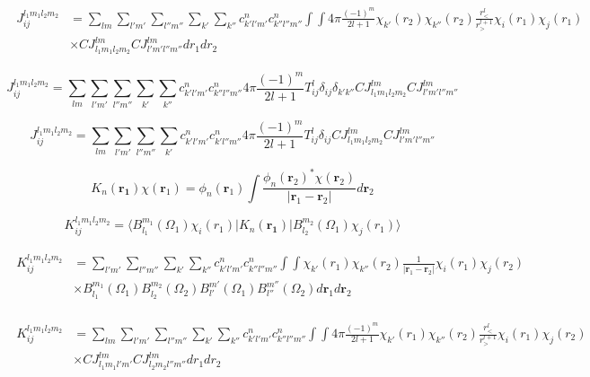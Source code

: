 \documentclass[nobibnotes, amssymb,aps,superscriptaddress]{revtex4-1}
\begin{document}
\begin{eqnarray}
\begin{split}
J_{ij}^{l_1m_1l_2m_2}&=\sum_{lm}\sum_{l'm'}\sum_{l''m''}\sum_{k'}\sum_{k''} c_{k'l'm'}^n c_{k''l''m''}^n \int \int 4\pi \frac{(-1)^m}{2l+1}\chi_{k'}(r_2) \chi_{k''}(r_2)\frac{r^l_{<}}{r^{l+1}_>}\chi_{i}(r_1) \chi_{j}(r_1)\\
& \times CJ_{l_1m_1l_2m_2}^{lm}CJ_{l'm'l''m''}^{lm} dr_1dr_2
\end{split}
\end{eqnarray}

\begin{equation}
J_{ij}^{l_1m_1l_2m_2}=\sum_{lm}\sum_{l'm'}\sum_{l''m''}\sum_{k'}\sum_{k''} c_{k'l'm'}^n c_{k''l''m''}^n 4\pi \frac{(-1)^m}{2l+1} T^l_{ij} \delta_{ij} \delta_{k'k''} CJ_{l_1m_1l_2m_2}^{lm}CJ_{l'm'l''m''}^{lm} 
\end{equation}

\begin{equation}
J_{ij}^{l_1m_1l_2m_2}=\sum_{lm}\sum_{l'm'}\sum_{l''m''}\sum_{k'}c_{k'l'm'}^n c_{k'l''m''}^n 4\pi \frac{(-1)^m}{2l+1} T^l_{ij} \delta_{ij} CJ_{l_1m_1l_2m_2}^{lm}CJ_{l'm'l''m''}^{lm} 
\end{equation}


\begin{equation}
K_n(\mathbf{r_1})\chi(\mathbf{r}_1)=\phi_n(\mathbf{r}_1)\int \frac{\phi_n(\mathbf{r}_2)^*\chi(\mathbf{r}_2)}{|\mathbf{r}_1-\mathbf{r}_2|}d\mathbf{r}_2
\end{equation}

\begin{equation}
K_{ij}^{l_1m_1l_2m_2}=\langle B_{l_1}^{m_1}(\Omega_1) \chi_i(r_1) |K_n(\mathbf{r_1})| B_{l_2}^{m_2}(\Omega_1) \chi_j(r_1)\rangle
\end{equation}

\begin{eqnarray}
\begin{split}
K_{ij}^{l_1m_1l_2m_2}&=\sum_{l'm'}\sum_{l''m''}\sum_{k'}\sum_{k''} c_{k'l'm'}^n c_{k''l''m''}^n \int \int \chi_{k'}(r_1) \chi_{k''}(r_2)\frac{1}{|\mathbf{r}_1-\mathbf{r}_2|}\chi_{i}(r_1) \chi_{j}(r_2)\\
& \times B_{l_1}^{m_1}(\Omega_1) B_{l_2}^{m_2}(\Omega_2) B_{l'}^{m'}(\Omega_1) B_{l''}^{m''}(\Omega_2) d\mathbf{r}_1d\mathbf{r}_2
\end{split}
\end{eqnarray}


\begin{eqnarray}
\begin{split}
K_{ij}^{l_1m_1l_2m_2}&=\sum_{lm}\sum_{l'm'}\sum_{l''m''}\sum_{k'}\sum_{k''} c_{k'l'm'}^n c_{k''l''m''}^n \int \int 4\pi \frac{(-1)^m}{2l+1}\chi_{k'}(r_1) \chi_{k''}(r_2)\frac{r^l_{<}}{r^{l+1}_>}\chi_{i}(r_1) \chi_{j}(r_2)\\
& \times CJ_{l_1m_1l'm'}^{lm}CJ_{l_2m_2l''m''}^{lm} dr_1dr_2
\end{split}
\end{eqnarray}
\end{document}
